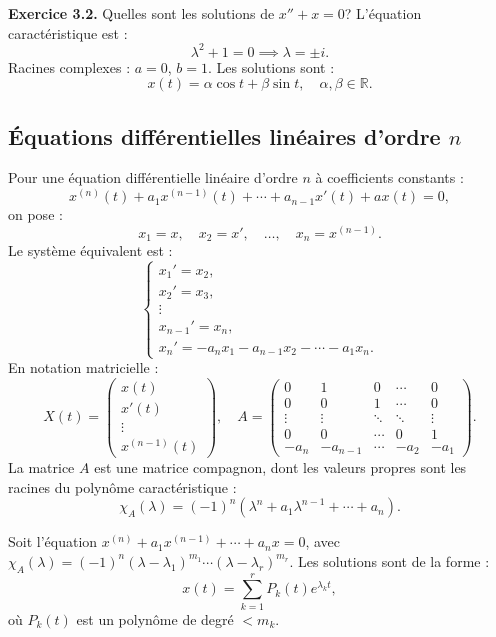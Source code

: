 \textbf{Exercice 3.2.} Quelles sont les solutions de \( x'' + x = 0 \)?  
L'équation caractéristique est :
\[
\lambda^2 + 1 = 0 \implies \lambda = \pm i.
\]
Racines complexes : \( a = 0 \), \( b = 1 \). Les solutions sont :
\[
x(t) = \alpha \cos t + \beta \sin t, \quad \alpha, \beta \in \mathbb{R}.
\]

\subsection{Équations différentielles linéaires d'ordre \( n \)}
Pour une équation différentielle linéaire d'ordre \( n \) à coefficients constants :
\[
x^{(n)}(t) + a_1 x^{(n-1)}(t) + \cdots + a_{n-1} x'(t) + a x(t) = 0,
\]
on pose :
\[
x_1 = x, \quad x_2 = x', \quad \dots, \quad x_n = x^{(n-1)}.
\]
Le système équivalent est :
\[
\begin{cases}
x_1' = x_2, \\
x_2' = x_3, \\
\vdots \\
x_{n-1}' = x_n, \\
x_n' = -a_n x_1 - a_{n-1} x_2 - \cdots - a_1 x_n.
\end{cases}
\]
En notation matricielle :
\[
X(t) = \begin{pmatrix} x(t) \\ x'(t) \\ \vdots \\ x^{(n-1)}(t) \end{pmatrix}, \quad A = \begin{pmatrix}
0 & 1 & 0 & \cdots & 0 \\
0 & 0 & 1 & \cdots & 0 \\
\vdots & \vdots & \ddots & \ddots & \vdots \\
0 & 0 & \cdots & 0 & 1 \\
-a_n & -a_{n-1} & \cdots & -a_2 & -a_1
\end{pmatrix}.
\]
La matrice \( A \) est une matrice compagnon, dont les valeurs propres sont les racines du polynôme caractéristique :
\[
\chi_A(\lambda) = (-1)^n \left( \lambda^n + a_1 \lambda^{n-1} + \cdots + a_n \right).
\]

\begin{theoreme}
	Soit l'équation \( x^{(n)} + a_1 x^{(n-1)} + \cdots + a_n x = 0 \), avec \( \chi_A(\lambda) = (-1)^n (\lambda - \lambda_1)^{m_1} \cdots (\lambda - \lambda_r)^{m_r} \). Les solutions sont de la forme :
	\[
	x(t) = \sum_{k=1}^r P_k(t) e^{\lambda_k t},
	\]
	où \( P_k(t) \) est un polynôme de degré \( < m_k \).
\end{theoreme}

